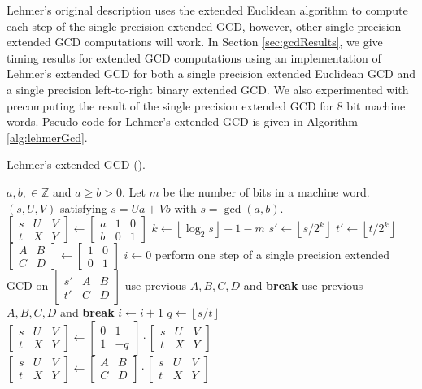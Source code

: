 \documentclass{ucalgthes1}
\theoremstyle{definition}
\newcommand{\ZZ}{\mathbb{Z}}
\newcommand{\matrixtt}[4]{\left[ \begin{array}{rr} #1 & #2 \\ #3 & #4 \end{array} \right]}
\newcommand{\matrixThreeTwo}[6]{\left[ \begin{array}{rrr} #1 & #2 & #3 \\ #4 & #5 & #6 \end{array} \right]}
\newcommand{\floor}[1]{\left\lfloor #1 \right\rfloor}
\begin{document}
Lehmer's original description \cite{Lehmer1938} uses the extended Euclidean algorithm to compute each step of the single precision extended GCD, however, other single precision extended GCD computations will work.  In Section \ref{sec:gcdResults}, we give timing results for extended GCD computations using an implementation of Lehmer's extended GCD for both a single precision extended Euclidean GCD and a single precision left-to-right binary extended GCD.  We also experimented with precomputing the result of the single precision extended GCD for 8 bit machine words.  Pseudo-code for Lehmer's extended GCD is given in Algorithm \ref{alg:lehmerGcd}.


\begin{algorithm}[htb]
\caption{Lehmer's extended GCD (\cite{Lehmer1938}).}
\label{alg:lehmerGcd}
\begin{algorithmic}[1]
\Require $a,b, \in \ZZ$ and $a \ge b > 0$. Let $m$ be the number of bits in a machine word.
\Ensure $(s, U, V)$ satisfying $s = Ua + Vb$ with $s = \gcd(a, b)$.
\State $\matrixThreeTwo{s}{U}{V}{t}{X}{Y} \gets \matrixThreeTwo{a}{1}{0}{b}{0}{1}$
	\State $k \gets \floor{\log_2 s} + 1 - m$
	\State $s' \gets \floor{s / 2^k}$ 
	\State $t' \gets \floor{t / 2^k}$
	\State $\matrixtt{A}{B}{C}{D} \gets \matrixtt{1}{0}{0}{1}$
	\State $i \gets 0$
		\State perform one step of a single precision extended GCD on $\matrixThreeTwo{s'}{A}{B}{t'}{C}{D}$
			 use previous $A, B, C, D$ and \textbf{break} \EndIf
		\Else {} use previous $A, B, C, D$ and \textbf{break} \EndIf
		\EndIf
		\State $i \gets i + 1$
	\EndWhile
		\State $q \gets \floor{s/t}$  
		\State $\matrixThreeTwo{s}{U}{V}{t}{X}{Y} \gets \matrixtt{0}{1}{1}{-q}
		        \cdot \matrixThreeTwo{s}{U}{V}{t}{X}{Y}$
	\Else
		\State $\matrixThreeTwo{s}{U}{V}{t}{X}{Y} \gets \matrixtt{A}{B}{C}{D}
		        \cdot \matrixThreeTwo{s}{U}{V}{t}{X}{Y}$ 
	\EndIf
\EndWhile
\end{algorithmic}
\end{algorithm}
\end{document}
